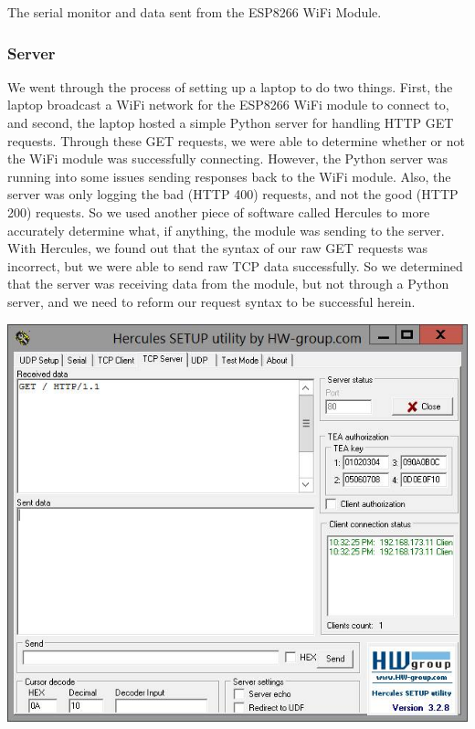 \documentclass{article}
\begin{document}
\begin{center}
The serial monitor and data sent from the ESP8266 WiFi Module.
\end{center}

\subsubsection*{Server}
\indent

We went through the process of setting up a laptop to do two things. First, the laptop broadcast a WiFi network for the ESP8266 WiFi module to connect to, and second, the laptop hosted a simple Python server for handling HTTP GET requests. Through these GET requests, we were able to determine whether or not the WiFi module was successfully connecting. However, the Python server was running into some issues sending responses back to the WiFi module. Also, the server was only logging the bad (HTTP 400) requests, and not the good (HTTP 200) requests. So we used another piece of software called Hercules to more accurately determine what, if anything, the module was sending to the server. With Hercules, we found out that the syntax of our raw GET requests was incorrect, but we were able to send raw TCP data successfully. So we determined that the server was receiving data from the module, but not through a Python server, and we need to reform our request syntax to be successful herein.

\centerline{\includegraphics[scale=.5]{Hercules}}
\end{document}
